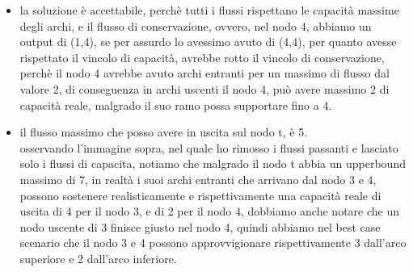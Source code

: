 \documentclass{article}
\begin{document}
\begin{itemize}
	
\item la soluzione è accettabile, perchè tutti i flussi rispettano le capacità massime degli archi, e il flusso di conservazione, ovvero, nel nodo 4, abbiamo un output di (1,4), se per assurdo lo avessimo avuto di (4,4), per quanto avesse rispettato il vincolo di capacità, avrebbe rotto il vincolo di conservazione, perchè il nodo 4 avrebbe avuto archi entranti per un massimo di flusso dal valore 2, di conseguenza in archi uscenti il nodo 4, può avere massimo 2 di capacità reale, malgrado il suo ramo possa supportare fino a 4.\\

\begin{center}
\end{center}
\item il flusso massimo che posso avere in uscita sul nodo t, è 5.\\
osservando l'immagine sopra, nel quale ho rimosso i flussi passanti e lasciato solo i flussi di capacita, notiamo che malgrado il nodo t abbia un upperbound massimo di 7, in realtà i suoi archi entranti che arrivano dal nodo 3 e 4, possono sostenere realisticamente e rispettivamente una capacità reale di uscita di 4 per il nodo 3, e di 2 per il nodo 4, dobbiamo anche notare che un nodo uscente di 3 finisce giusto nel nodo 4, quindi abbiamo nel best case scenario che il nodo 3 e 4 possono approvvigionare rispettivamente 3 dall'arco superiore e 2 dall'arco inferiore.


\end{itemize}
\end{document}
